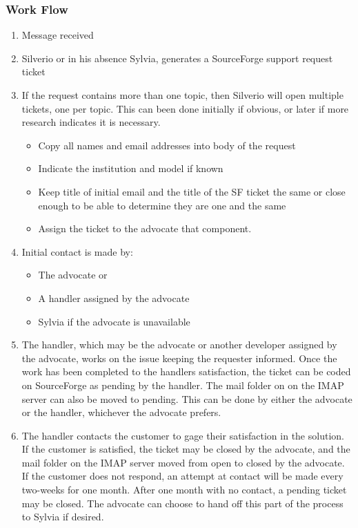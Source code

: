 \subsubsection{Work Flow}
\begin{enumerate}
\item Message received
\item Silverio or in his absence Sylvia, generates a SourceForge support request ticket
\item If the request contains more than one topic, then Silverio will open multiple tickets, one per topic. This can been done
initially if obvious, or later if more research indicates it is necessary. 

\begin{itemize}
\item Copy all names and email addresses into body of the request
\item Indicate the institution and model if known
\item Keep title of initial email and the title of the SF ticket the same or close enough to be able to determine they are one and the same
\item Assign the ticket to the advocate that component. 
\end{itemize}

\item Initial contact is made by:

\begin{itemize}
\item The advocate or
\item A handler assigned by the advocate
\item Sylvia if the advocate is unavailable
\end{itemize}

\item The handler, which may be the advocate or another developer assigned by the advocate, works on the issue keeping the requester informed. Once the work has been completed to the handlers satisfaction, the ticket can be coded on SourceForge as pending by the handler.  The mail folder on 
on the IMAP server can also be moved to pending. This can be done by either the advocate or the handler, whichever the advocate prefers.

\item The handler contacts the customer to gage their satisfaction in the solution. If the customer is satisfied, the ticket may be closed by the advocate, and the mail folder on the IMAP server moved from open to 
closed by the advocate.  If the customer does not respond, an attempt at contact will be made every two-weeks for one month.  After one month with no contact, a pending ticket may be closed. The advocate can choose to hand off this part of the process to Sylvia if desired. 
\end{enumerate}

